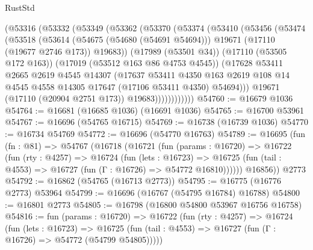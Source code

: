 \begin{lexlean}{RustStd}
\begin{coremodule}
            (@53316
              (@53332
                (@53349
                  (@53362
                    (@53370
                      (@53374
                        (@53410
                          (@53456
                            (@53474
                              (@53518
                                (@53614
                                  (@54675 (@54680 (@54691 @54694)))
                                  @19671
                                  (@17110 (@19677 @2746 @173))
                                  @19683))
                              (@17989 (@53501 @34))
                              (@17110 (@53505 @172 @163))
                              (@17019 (@53512 @163 @86 @4753 @4545))
                              (@17628
                                @53411
                                @2665
                                @2619
                                @4545
                                @14307
                                (@17637
                                  @53411
                                  @4350
                                  @163
                                  @2619
                                  @108
                                  @14
                                  @4545
                                  @4558
                                  @14305
                                  @17647
                                  (@17106 @53411 @4350)
                                  @54694)))
                            @19671
                            (@17110 (@20904 @2751 @173))
                            @19683))))))))))))
@54760 := @16679 @1036
@54764 := @16681 (@16685 @1036) (@16691 @1036)
@54765 := @16700 @53961
@54767 := @16696 (@54765 @16715)
@54769 := @16738 (@16739 @1036)
@54770 := @16734 @54769
@54772 := @16696 (@54770 @16763)
@54789 := @16695
    (fun (fn : @81) =>
    @54767
      (@16718
        (@16721
          (fun (params : @16720) =>
          @16722
            (fun (rty : @4257) =>
            @16724
              (fun (lets : @16723) =>
              @16725 (fun (tail : @4553) => @16727 (fun (Γ : @16726) => @54772 @16810))))))
        @16856))
    @2773
@54792 := @16862 (@54765 (@16713 @2773))
@54795 := @16775 (@16776 @2773) @53964
@54799 := @16696 (@16767 (@54795 @16784) @16788)
@54800 := @16801 @2773
@54805 := @16798 (@16800 @54800 @53967 @16756 @16758)
@54816 := fun (params : @16720) =>
  @16722
    (fun (rty : @4257) =>
    @16724
      (fun (lets : @16723) =>
      @16725 (fun (tail : @4553) => @16727 (fun (Γ : @16726) => @54772 (@54799 @54805)))))

\end{coremodule}
\end{lexlean}
